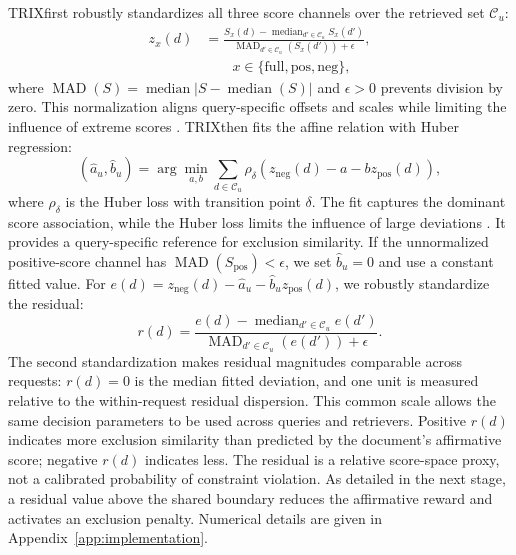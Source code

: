 \documentclass[letterpaper]{article}
\newcommand{\method}{\ifmmode \mathrm{TRIX}\else TRIX\xspace\fi}
\begin{document}
\method first robustly standardizes all three score channels over the retrieved
set $\mathcal C_u$:
\begin{equation}
\begin{aligned}
 z_x(d)&=\frac{S_x(d)-\operatorname{median}_{d'\in\mathcal C_u}S_x(d')}
 {\operatorname{MAD}_{d'\in\mathcal C_u}(S_x(d'))+\epsilon},\\
 &\qquad x\in\{\mathrm{full},\mathrm{pos},\mathrm{neg}\},
\end{aligned}
\label{eq:trix-normalization}
\end{equation}
where $\operatorname{MAD}(S)=\operatorname{median}|S-\operatorname{median}(S)|$
and $\epsilon>0$ prevents division by zero.  This normalization aligns
query-specific offsets and scales while limiting the influence of extreme
scores \cite{rousseeuw1993mad}.  \method then fits the affine relation with
Huber regression:
\begin{equation}
 (\hat a_u,\hat b_u)=\arg\min_{a,b}\sum_{d\in\mathcal C_u}
 \rho_\delta\!\left(z_{\mathrm{neg}}(d)-a-bz_{\mathrm{pos}}(d)\right),
 \label{eq:trix-huber}
\end{equation}
where $\rho_\delta$ is the Huber loss with transition point $\delta$.  The fit
captures the dominant score association, while the Huber loss limits the
influence of large deviations \cite{huber1964robust}.  It provides a
query-specific reference for exclusion similarity.  If
the unnormalized positive-score channel has
$\operatorname{MAD}(S_{\mathrm{pos}})<\epsilon$, we set $\hat b_u=0$ and use
a constant fitted value.
For $e(d)=z_{\mathrm{neg}}(d)-\hat a_u-\hat b_u z_{\mathrm{pos}}(d)$,
we robustly standardize the residual:
\begin{equation}
 r(d)=\frac{e(d)-\operatorname{median}_{d'\in\mathcal C_u}e(d')}
 {\operatorname{MAD}_{d'\in\mathcal C_u}(e(d'))+\epsilon}.
 \label{eq:trix-residual}
\end{equation}
The second standardization makes residual magnitudes comparable across
requests: $r(d)=0$ is the median fitted deviation, and one unit is measured
relative to the within-request residual dispersion.  This common scale allows
the same decision parameters to be used across queries and retrievers.
Positive $r(d)$ indicates more exclusion similarity than predicted by the
document's affirmative score; negative $r(d)$ indicates less.  The residual is
a relative score-space proxy, not a calibrated probability of constraint
violation.  As detailed in the next stage, a residual value above the shared
boundary reduces the affirmative reward and activates an exclusion penalty.
Numerical details are given in
Appendix~\ref{app:implementation}.
\end{document}
